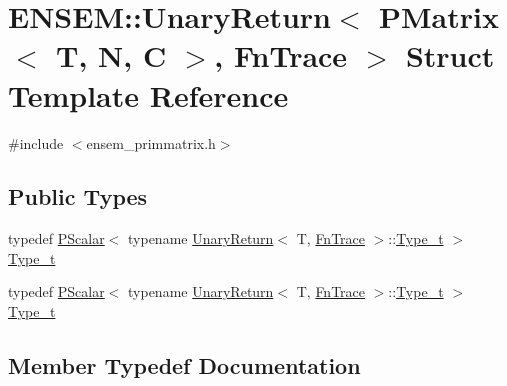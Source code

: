 \hypertarget{structENSEM_1_1UnaryReturn_3_01PMatrix_3_01T_00_01N_00_01C_01_4_00_01FnTrace_01_4}{}\section{E\+N\+S\+EM\+:\+:Unary\+Return$<$ P\+Matrix$<$ T, N, C $>$, Fn\+Trace $>$ Struct Template Reference}
\label{structENSEM_1_1UnaryReturn_3_01PMatrix_3_01T_00_01N_00_01C_01_4_00_01FnTrace_01_4}


{\ttfamily \#include $<$ensem\+\_\+primmatrix.\+h$>$}

\subsection*{Public Types}
\begin{DoxyCompactItemize}
\item 
typedef \mbox{\hyperlink{classENSEM_1_1PScalar}{P\+Scalar}}$<$ typename \mbox{\hyperlink{structENSEM_1_1UnaryReturn}{Unary\+Return}}$<$ T, \mbox{\hyperlink{structENSEM_1_1FnTrace}{Fn\+Trace}} $>$\+::\mbox{\hyperlink{structENSEM_1_1UnaryReturn_3_01PMatrix_3_01T_00_01N_00_01C_01_4_00_01FnTrace_01_4_a8ec6f07f0fe243d3d023ab02325eaa05}{Type\+\_\+t}} $>$ \mbox{\hyperlink{structENSEM_1_1UnaryReturn_3_01PMatrix_3_01T_00_01N_00_01C_01_4_00_01FnTrace_01_4_a8ec6f07f0fe243d3d023ab02325eaa05}{Type\+\_\+t}}
\item 
typedef \mbox{\hyperlink{classENSEM_1_1PScalar}{P\+Scalar}}$<$ typename \mbox{\hyperlink{structENSEM_1_1UnaryReturn}{Unary\+Return}}$<$ T, \mbox{\hyperlink{structENSEM_1_1FnTrace}{Fn\+Trace}} $>$\+::\mbox{\hyperlink{structENSEM_1_1UnaryReturn_3_01PMatrix_3_01T_00_01N_00_01C_01_4_00_01FnTrace_01_4_a8ec6f07f0fe243d3d023ab02325eaa05}{Type\+\_\+t}} $>$ \mbox{\hyperlink{structENSEM_1_1UnaryReturn_3_01PMatrix_3_01T_00_01N_00_01C_01_4_00_01FnTrace_01_4_a8ec6f07f0fe243d3d023ab02325eaa05}{Type\+\_\+t}}
\end{DoxyCompactItemize}


\subsection{Member Typedef Documentation}
\mbox{\label{structENSEM_1_1UnaryReturn_3_01PMatrix_3_01T_00_01N_00_01C_01_4_00_01FnTrace_01_4_a8ec6f07f0fe243d3d023ab02325eaa05}} 
